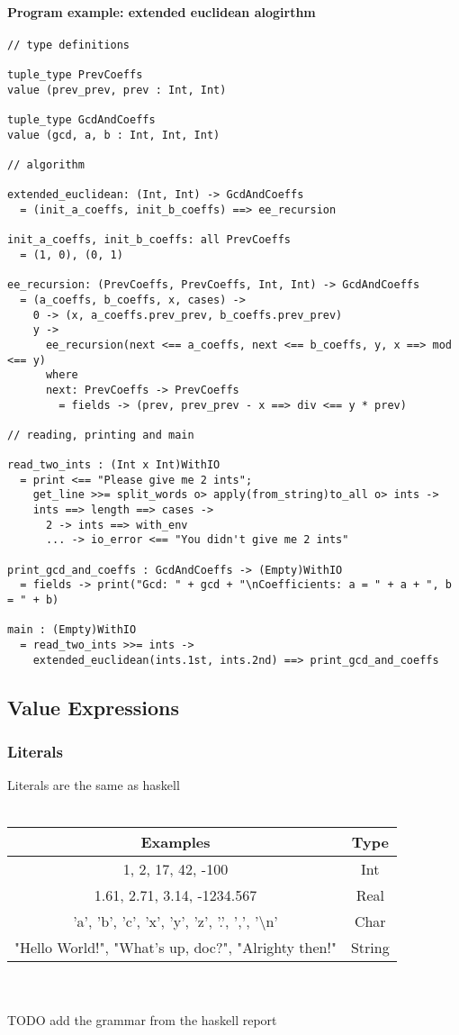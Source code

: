 \documentclass{article}
\begin{document}
\paragraph{Program example: extended euclidean alogirthm}
\begin{verbatim}
// type definitions

tuple_type PrevCoeffs
value (prev_prev, prev : Int, Int)

tuple_type GcdAndCoeffs
value (gcd, a, b : Int, Int, Int)

// algorithm

extended_euclidean: (Int, Int) -> GcdAndCoeffs
  = (init_a_coeffs, init_b_coeffs) ==> ee_recursion

init_a_coeffs, init_b_coeffs: all PrevCoeffs
  = (1, 0), (0, 1)

ee_recursion: (PrevCoeffs, PrevCoeffs, Int, Int) -> GcdAndCoeffs
  = (a_coeffs, b_coeffs, x, cases) ->
    0 -> (x, a_coeffs.prev_prev, b_coeffs.prev_prev)
    y ->
      ee_recursion(next <== a_coeffs, next <== b_coeffs, y, x ==> mod <== y)
      where
      next: PrevCoeffs -> PrevCoeffs
        = fields -> (prev, prev_prev - x ==> div <== y * prev)

// reading, printing and main

read_two_ints : (Int x Int)WithIO
  = print <== "Please give me 2 ints";
    get_line >>= split_words o> apply(from_string)to_all o> ints ->
    ints ==> length ==> cases ->
      2 -> ints ==> with_env
      ... -> io_error <== "You didn't give me 2 ints"
 
print_gcd_and_coeffs : GcdAndCoeffs -> (Empty)WithIO
  = fields -> print("Gcd: " + gcd + "\nCoefficients: a = " + a + ", b = " + b)

main : (Empty)WithIO
  = read_two_ints >>= ints ->
    extended_euclidean(ints.1st, ints.2nd) ==> print_gcd_and_coeffs
\end{verbatim}

\subsection{Value Expressions}

\subsubsection{Literals}

Literals are the same as haskell \\ \\
\begin{tabular}{ |c|c| } 
\hline
Examples & Type \\ 
\hline
\hline
1, 2, 17, 42, -100 & Int \\ 
\hline
1.61, 2.71, 3.14, -1234.567 & Real \\ 
\hline
'a', 'b', 'c', 'x', 'y', 'z', '.', ',', '\textbackslash n' & Char \\
\hline
"Hello World!", "What's up, doc?", "Alrighty then!" & String \\
\hline
\end{tabular}
\\\\
TODO add the grammar from the haskell report
\end{document}
